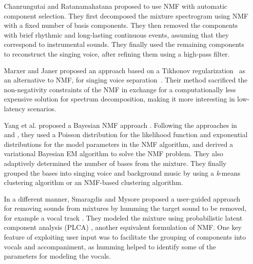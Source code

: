 Chanrungutai and Ratanamahatana proposed to use NMF with automatic component selection\cite{chanrungutai08,chanrungutai082}. They first decomposed the mixture spectrogram using NMF with a fixed number of basis components. They then removed the components with brief rhythmic and long-lasting continuous events, assuming that they correspond to instrumental sounds. They finally used the remaining components to reconstruct the singing voice, after refining them using a high-pass filter.

Marxer and Janer proposed an approach based on a Tikhonov regularization~\cite{tikhonov63} as an alternative to NMF, for singing voice separation~\cite{marxer122}. Their method sacrificed the non-negativity constraints of the NMF in exchange for a computationally less expensive solution for spectrum decomposition, making it more interesting in low-latency scenarios.

Yang et al. proposed a Bayesian NMF approach \cite{yang14,chien15}. Following the approaches in \cite{cemgil09} and \cite{schmidt09}, they used a Poisson distribution for the likelihood function and exponential distributions for the model parameters in the NMF algorithm, and derived a variational Bayesian EM  algorithm \cite{dempster77} to solve the NMF problem. They also adaptively determined the number of bases from the mixture. They finally grouped the bases into singing voice and background music by using a \textit{k}-means clustering algorithm \cite{spiertz09} or an NMF-based clustering algorithm.

In a different manner, Smaragdis and Mysore proposed a user-guided approach for removing sounds from mixtures by humming the target sound to be removed, for example a vocal track \cite{smaragdis09}. They modeled the mixture using probabilistic latent component analysis (PLCA) \cite{smaragdis07}, another equivalent formulation of NMF. One key feature of exploiting user input was to facilitate the grouping of components into vocals and accompaniment, as humming helped to identify some of the parameters for modeling the vocals.

